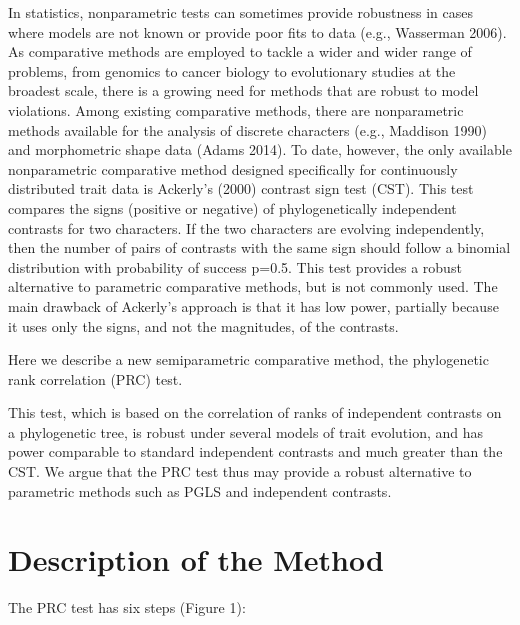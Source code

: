 \documentclass[fleqn,10pt,lineno]{wlpeerj} %
\begin{document}
In statistics, nonparametric tests can sometimes provide robustness in cases where models are not known or provide poor fits to data (e.g., Wasserman 2006). As comparative methods are employed to tackle a wider and wider range of problems, from genomics to cancer biology to evolutionary studies at the broadest scale, there is a growing need for methods that are robust to model violations. Among existing comparative methods, there are nonparametric methods available for the analysis of discrete characters (e.g., Maddison 1990) and morphometric shape data (Adams 2014). To date, however, the only available nonparametric comparative method designed specifically for continuously distributed trait data is Ackerly's (2000) contrast sign test (CST). This test compares the signs (positive or negative) of phylogenetically independent contrasts for two characters. If the two characters are evolving independently, then the number of pairs of contrasts with the same sign should follow a binomial distribution with probability of success p=0.5. This test provides a robust alternative to parametric comparative methods, but is not commonly used. The main drawback of Ackerly's approach is that it has low power, partially because it uses only the signs, and not the magnitudes, of the contrasts.

Here we describe a new semiparametric comparative method, the phylogenetic rank correlation (PRC) test.

This test, which is based on the correlation of ranks of independent contrasts on a phylogenetic tree, is robust under several models of trait evolution, and has power comparable to standard independent contrasts and much greater than the CST. We argue that the PRC test thus may provide a robust alternative to parametric methods such as PGLS and independent contrasts.

\section{Description of the Method}\label{description-of-the-method}

The PRC test has six steps (Figure 1):
\end{document}
